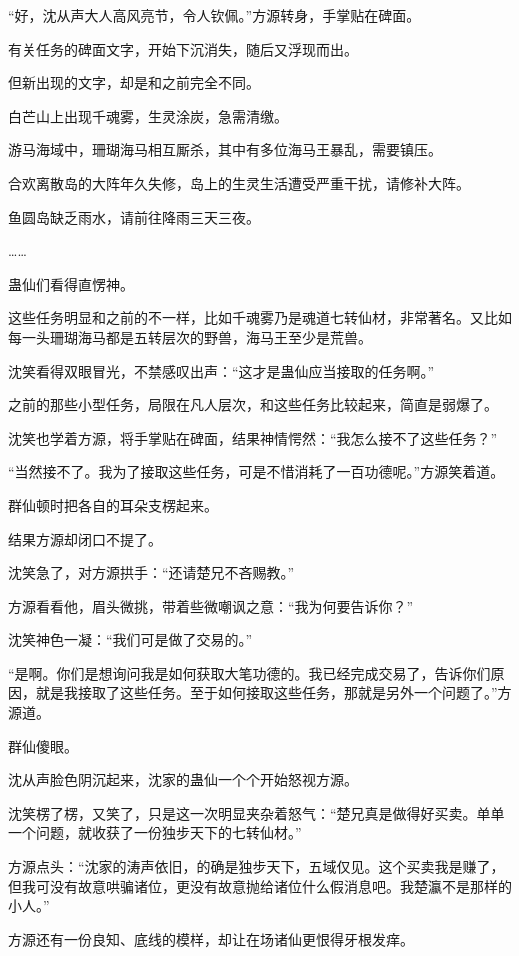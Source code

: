 \begin{this_body}
“好，沈从声大人高风亮节，令人钦佩。”方源转身，手掌贴在碑面。

有关任务的碑面文字，开始下沉消失，随后又浮现而出。

但新出现的文字，却是和之前完全不同。

白芒山上出现千魂雾，生灵涂炭，急需清缴。

游马海域中，珊瑚海马相互厮杀，其中有多位海马王暴乱，需要镇压。

合欢离散岛的大阵年久失修，岛上的生灵生活遭受严重干扰，请修补大阵。

鱼圆岛缺乏雨水，请前往降雨三天三夜。

……

蛊仙们看得直愣神。

这些任务明显和之前的不一样，比如千魂雾乃是魂道七转仙材，非常著名。又比如每一头珊瑚海马都是五转层次的野兽，海马王至少是荒兽。

沈笑看得双眼冒光，不禁感叹出声：“这才是蛊仙应当接取的任务啊。”

之前的那些小型任务，局限在凡人层次，和这些任务比较起来，简直是弱爆了。

沈笑也学着方源，将手掌贴在碑面，结果神情愕然：“我怎么接不了这些任务？”

“当然接不了。我为了接取这些任务，可是不惜消耗了一百功德呢。”方源笑着道。

群仙顿时把各自的耳朵支楞起来。

结果方源却闭口不提了。

沈笑急了，对方源拱手：“还请楚兄不吝赐教。”

方源看看他，眉头微挑，带着些微嘲讽之意：“我为何要告诉你？”

沈笑神色一凝：“我们可是做了交易的。”

“是啊。你们是想询问我是如何获取大笔功德的。我已经完成交易了，告诉你们原因，就是我接取了这些任务。至于如何接取这些任务，那就是另外一个问题了。”方源道。

群仙傻眼。

沈从声脸色阴沉起来，沈家的蛊仙一个个开始怒视方源。

沈笑楞了楞，又笑了，只是这一次明显夹杂着怒气：“楚兄真是做得好买卖。单单一个问题，就收获了一份独步天下的七转仙材。”

方源点头：“沈家的涛声依旧，的确是独步天下，五域仅见。这个买卖我是赚了，但我可没有故意哄骗诸位，更没有故意抛给诸位什么假消息吧。我楚瀛不是那样的小人。”

方源还有一份良知、底线的模样，却让在场诸仙更恨得牙根发痒。


\end{this_body}
